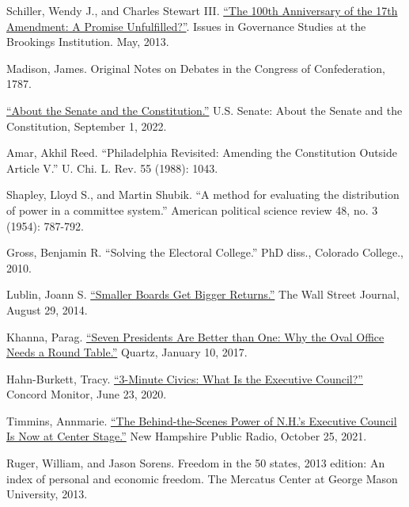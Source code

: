 \documentclass{article}
\newcommand{\quotes}[1]{``#1''}
\begin{document}
\begin{thebibliography}{20}
Schiller, Wendy J., and Charles Stewart III. \href{https://www.brookings.edu/wp-content/uploads/2016/06/Schiller_17th-Amendment_v7.pdf}{\quotes{The 100th Anniversary of the 17th Amendment: A Promise Unfulfilled?}}. Issues in Governance Studies at the Brookings Institution. May, 2013.

Madison, James. Original Notes on Debates in the Congress of Confederation, 1787.

\href{https://www.senate.gov/about/origins-foundations/senate-and-constitution.htm}{\quotes{About the Senate and the Constitution.}} U.S. Senate: About the Senate and the Constitution, September 1, 2022.

Amar, Akhil Reed. \quotes{Philadelphia Revisited: Amending the Constitution Outside Article V.} U. Chi. L. Rev. 55 (1988): 1043.

Shapley, Lloyd S., and Martin Shubik. \quotes{A method for evaluating the distribution of power in a committee system.} American political science review 48, no. 3 (1954): 787-792.

Gross, Benjamin R. \quotes{Solving the Electoral College.} PhD diss., Colorado College., 2010.

Lublin, Joann S. \href{https://www.wsj.com/articles/smaller-boards-get-bigger-returns-1409078628}{\quotes{Smaller Boards Get Bigger Returns.}} The Wall Street Journal, August 29, 2014. 

Khanna, Parag. \href{https://qz.com/876260/seven-presidents-are-better-than-one-why-the-oval-office-needs-a-round-table}{\quotes{Seven Presidents Are Better than One: Why the Oval Office Needs a Round Table.}} Quartz, January 10, 2017.

Hahn-Burkett, Tracy. \href{https://www.concordmonitor.com/What-is-the-Executive-Council-34817477}{\quotes{3-Minute Civics: What Is the Executive Council?}} Concord Monitor, June 23, 2020.

Timmins, Annmarie. \href{https://www.nhpr.org/nh-news/2021-10-25/executive-council}{\quotes{The Behind-the-Scenes Power of N.H.’s Executive Council Is Now at Center Stage.}} New Hampshire Public Radio, October 25, 2021. 

Ruger, William, and Jason Sorens. Freedom in the 50 states, 2013 edition: An index of personal and economic freedom. The Mercatus Center at George Mason University, 2013.


\end{thebibliography}
\end{document}
